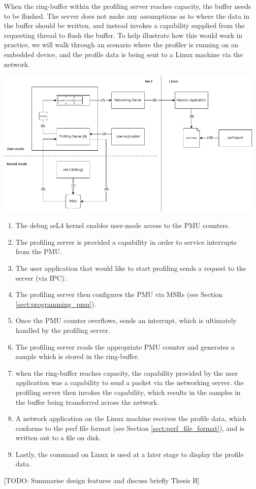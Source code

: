 When the ring-buffer within the profiling server reaches capacity, the buffer needs to be flushed. The server does not make any assumptions as to where the data in the buffer should be written, and instead invokes a capability supplied from the requesting thread to flush the buffer. To help illustrate how this would work in practice, we will walk through an scenario where the profiler is running on an embedded device, and the profile data is being sent to a Linux machine via the network. 

\includegraphics[width=\linewidth]{thesis_a_design_overview.drawio}


\ssp\begin{enumerate}
    \item The debug seL4 kernel enables user-mode access to the PMU counters.
    \item The profiling server is provided a capability in order to service interrupts from the PMU.
    \item The user application that would like to start profiling sends a request to the server (via IPC).
    \item The profiling server then configures the PMU via MSRs (see Section \ref{sect:programming_pmu}).
    \item Once the PMU counter overflows, sends an interrupt, which is ultimately handled by the profiling server.
    \item The profiling server reads the appropriate PMU counter and generates a sample which is stored in the ring-buffer.
    \item when the ring-buffer reaches capacity, the capability provided by the user application was a capability to send a packet via the networking server. the profiling server then invokes the capability, which results in the samples in the buffer being transferred across the network.
    \item A network application on the Linux machine receives the profile data, which conforms to the perf file format (see Section \ref{sect:perf_file_format}), and is written out to a file on disk.
    \item Lastly, the  command on Linux is used at a later stage to display the profile data.
\end{enumerate}\dsp

[TODO: Summarise design features and discuss briefly Thesis B]